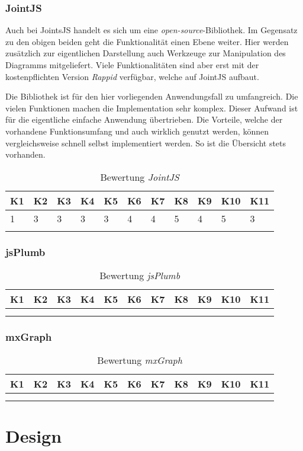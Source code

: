 \subsubsection{JointJS}
Auch bei JointsJS handelt es sich um eine \textit{open-source}-Bibliothek. Im Gegensatz zu den obigen beiden geht die Funktionalität einen Ebene weiter. Hier werden zusätzlich zur eigentlichen Darstellung auch Werkzeuge zur Manipulation des Diagramms mitgeliefert. Viele Funktionalitäten sind aber erst mit der kostenpflichten Version \textit{Rappid} verfügbar, welche auf JointJS aufbaut. \cite{jointsjs}

Die Bibliothek ist für den hier vorliegenden Anwendungsfall zu umfangreich. Die vielen Funktionen machen die Implementation sehr komplex. Dieser Aufwand ist für die eigentliche einfache Anwendung übertrieben. Die Vorteile, welche der vorhandene Funktionsumfang und auch wirklich genutzt werden, können vergleichsweise schnell selbst implementiert werden. So ist die Übersicht stets vorhanden.

\begin{longtable}{|p{0.5cm}|p{0.5cm}|p{0.5cm}|p{0.5cm}|p{0.5cm}|p{0.5cm}|p{0.5cm}|p{0.5cm}|p{0.5cm}|p{0.7cm}|p{0.7cm}|}
  \hline
    K1 & K2 & K3 & K4 & K5 & K6 & K7 & K8 & K9 & K10 & K11 \\\hline
    1 & 3 & 3 & 3 & 3 & 4 & 4 & 5 & 4 & 5 & 3\\\hline
    \caption{Bewertung \textit{JointJS}}
  \label{tab:bewertung-jointjs}
\end{longtable}

\subsubsection{jsPlumb}

\begin{longtable}{|p{0.5cm}|p{0.5cm}|p{0.5cm}|p{0.5cm}|p{0.5cm}|p{0.5cm}|p{0.5cm}|p{0.5cm}|p{0.5cm}|p{0.7cm}|p{0.7cm}|}
  \hline
    K1 & K2 & K3 & K4 & K5 & K6 & K7 & K8 & K9 & K10 & K11 \\\hline
    & & & & & & & & & &\\\hline
    \caption{Bewertung \textit{jsPlumb}}
  \label{tab:bewertung-jsplumb}
\end{longtable}


\subsubsection{mxGraph}

\begin{longtable}{|p{0.5cm}|p{0.5cm}|p{0.5cm}|p{0.5cm}|p{0.5cm}|p{0.5cm}|p{0.5cm}|p{0.5cm}|p{0.5cm}|p{0.7cm}|p{0.7cm}|}
  \hline
    K1 & K2 & K3 & K4 & K5 & K6 & K7 & K8 & K9 & K10 & K11 \\\hline
    & & & & & & & & & &\\\hline
    \caption{Bewertung \textit{mxGraph}}
  \label{tab:bewertung-mxgraph}
\end{longtable}
 
 \section{Design}
